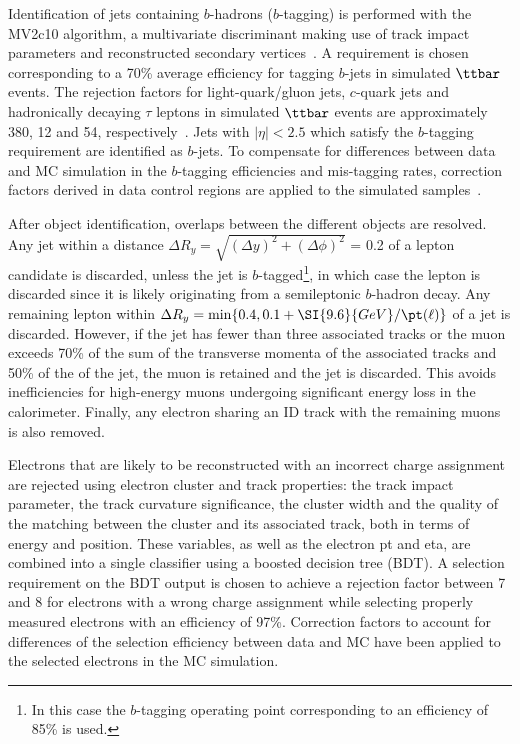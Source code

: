 Identification of jets containing $b$-hadrons ($b$-tagging) is performed with the MV2c10 algorithm, 
a multivariate discriminant making use of track impact parameters 
and reconstructed secondary vertices~\cite{Aad:2015ydr,ATL-PHYS-PUB-2015-022}.
A requirement is chosen corresponding to a 70\% average efficiency 
for tagging $b$-jets in simulated $\ttbar$ events. 
The rejection factors for light-quark/gluon jets, $c$-quark jets and hadronically decaying $\tau$ leptons in simulated $\ttbar$ events 
are approximately 380, 12 and 54, respectively~\cite{ATL-PHYS-PUB-2015-022,ATL-PHYS-PUB-2016-012}. 
Jets with $|\eta|<2.5$ which satisfy the $b$-tagging requirement are identified as $b$-jets. 
To compensate for differences between data and MC simulation in the $b$-tagging efficiencies and mis-tagging rates, 
correction factors derived in data control regions are applied to the simulated samples~\cite{ATL-PHYS-PUB-2015-022}. 

After object identification, overlaps between the different objects are resolved. 
Any jet within a distance $\Delta R_y =\sqrt{(\Delta y)^2+(\Delta\phi)^2}$ = 0.2 of a lepton candidate is discarded, 
unless the jet is $b$-tagged\footnote{In this case the $b$-tagging operating point corresponding to an efficiency of 85\% is used.},
in which case the lepton is discarded since it is likely originating from a semileptonic $b$-hadron decay. 
Any remaining lepton within $\Delta R_y= \operatorname{min}\{0.4, 0.1 + \SI{9.6}{GeV}/\pt(\ell)\}$ of a jet is discarded. 
However, if the jet has fewer than three associated tracks or the muon \pt exceeds 70\% of the sum of the transverse momenta 
of the associated tracks and 50\% of the \pt of the jet, the muon is retained and the jet is discarded. This avoids 
inefficiencies for high-energy muons undergoing significant energy loss in the calorimeter. 
Finally, any electron sharing an ID track with the remaining muons is also removed.


Electrons that are likely to be reconstructed with an incorrect charge assignment are rejected using electron
cluster and track properties: the track impact parameter, the track curvature significance, the cluster width and the
quality of the matching between the cluster and its associated track, both in terms of energy and position. These
variables, as well as the electron pt and eta,
are combined into a single classifier using a boosted decision tree (BDT). A selection requirement
on the BDT output is chosen to achieve a rejection factor between 7 and 8 for electrons with a wrong charge
assignment while selecting properly measured electrons with an efficiency of 97\%. Correction
factors to account for differences of the selection efficiency between data
and MC have been applied to the selected electrons in the MC simulation.

